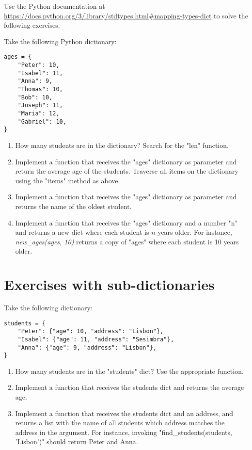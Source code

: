 Use the Python documentation at \url{https://docs.python.org/3/library/stdtypes.html#mapping-types-dict} to solve the following exercises.

Take the following Python dictionary:

\begin{verbatim}
ages = {
    "Peter": 10,
    "Isabel": 11,
    "Anna": 9,
    "Thomas": 10,
    "Bob": 10,
    "Joseph": 11,
    "Maria": 12,
    "Gabriel": 10,
}
\end{verbatim}

\begin{enumerate}

\item How many students are in the dictionary? Search for the "len" function.

\item Implement a function that receives the "ages" dictionary as parameter and return the average age of the students. Traverse all items on the dictionary using the "items" method as above.

\item Implement a function that receives the "ages" dictionary as parameter and returns the name of the oldest student.

\item Implement a function that receives the "ages" dictionary and a number "n" and returns a new dict where each student is $n$ years older. For instance, \textit{new\_ages(ages, 10)} returns a copy of "ages" where each student is 10 years older.

\end{enumerate}

\section{Exercises with sub-dictionaries}

Take the following dictionary:

\begin{verbatim}
students = {
    "Peter": {"age": 10, "address": "Lisbon"},
    "Isabel": {"age": 11, "address": "Sesimbra"},
    "Anna": {"age": 9, "address": "Lisbon"},
}
\end{verbatim}

\begin{enumerate}

\item How many students are in the "students" dict? Use the appropriate function.

\item Implement a function that receives the students dict and returns the average age.

\item Implement a function that receives the students dict and an address, and returns a list with the name of all students which address matches the address in the argument. For instance, invoking "find\_students(students, 'Lisbon')" should return Peter and Anna. 

\end{enumerate}
